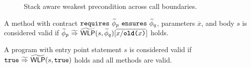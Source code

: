 \documentclass {llncs}
\begin{document}
\begin{figure}[h!]
\begin{small}
\begin{comment}
        \alpha \\
        \minimp \{~ \sphi'_n ~|~ \phiImplies{\gphi_n}{\phiCons{\sphi_f}{\sphi'_n}} ~\}\\
        \sphi_f \in \gamma(\gphi_f)\\
            \gphi_n

            \minimp \{~ \sphi'_n ~|~ \phiImplies{\gphi_n}{\phiCons{\gphi_f}{\sphi'_n}} ~\}

            \withqm{\minimp \{~ \sphi'_n ~|~ \phiImplies{\gphi_n}{\sphi'_n} ~\wedge~ \staticFP{\sphi'_n} = \emptyset ~\}}

        \withqm{\minimp \{~ \sphi'_n ~|~ \phiImplies{\static{\gphi_n}}{\phiCons{\sphi_f}{\sphi'_n}} ~\}}\\
        \sphi_f \in \gamma(\gphi_f)\\
            \withqm{\minimp \{~ \sphi'_n ~|~ \phiImplies{\static{\gphi_n}}{\phiCons{\gphi_f}{\sphi'_n}} ~\}}

            \withqm{\minimp \{~ \sphi'_n ~|~ \phiImplies{\static{\gphi_n}}{\sphi'_n} ~\wedge~ \staticFP{\sphi'_n} = \emptyset ~\}}
        \end{comment}
    \end{small}
    \caption{Stack aware weakest precondition across call boundaries.}
    \label{fig:gvlrp-wlp-multi}
\end{figure}


\begin{definition}\label{def:gvlrp-valid-method}
   A method with contract $\textup{\texttt{requires}}~{\widetilde{\phi}_p}~\textup{\texttt{ensures}}~{\widetilde{\phi}_q}$, parameters $\overline{x}$, and body $s$ is considered valid if ${\widetilde{\phi}_p} \,\,{\widetilde{\Rightarrow}}\,\, {\widetilde{\textup{\textmd{\textsf{WLP}}}}(s,\widetilde{\phi}_q)[\overline{x/\textup{\texttt{\textbf{old}(}}{x}\textup{\texttt{)}}}]}$ holds.
\end{definition}

\begin{definition}\label{def:gvlrp-valid-prog}
   A program with entry point statement $s$ is considered valid if ${\textup{\texttt{true}}} \,\,{\widetilde{\Rightarrow}}\,\, {\widetilde{\textup{\textmd{\textsf{WLP}}}}(s,\textup{\texttt{true}})}$ holds and all methods are valid.
\end{definition}
\end{document}
